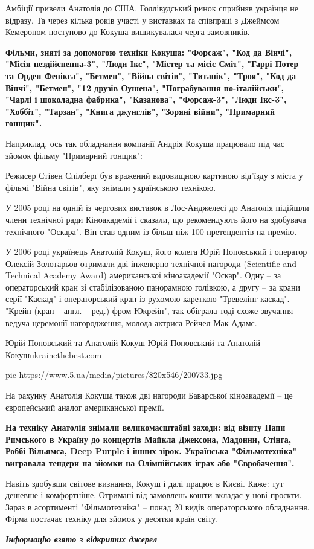 Амбіції привели Анатолія до США. Голлівудський ринок сприйняв українця не
відразу. Та через кілька років участі у виставках та співпраці з Джеймсом
Кемероном поступово до Кокуша вишикувалася черга замовників.

{\bfseries
Фільми, зняті за допомогою техніки Кокуша: "Форсаж", "Код да Вінчі",
"Місія нездійсненна-3", "Люди Ікс", "Містер та місіс Сміт", "Гаррі Потер
та Орден Фенікса", "Бетмен", "Війна світів", "Титанік", "Троя", "Код да
Вінчі", "Бетмен", "12 друзів Оушена", "Пограбування по-італійськи",
"Чарлі і шоколадна фабрика", "Казанова", "Форсаж-3", "Люди Ікс-3",
"Хоббіт", "Тарзан", "Книга джунглів", "Зоряні війни", "Примарний
гонщик".
}

Наприклад, ось так обладнання компанії Андрія Кокуша працювало під час
зйомок фільму "Примарний гонщик":

Режисер Стівен Спілберґ був вражений видовищною картиною від'їзду з міста
у фільмі "Війна світів", яку знімали українською технікою.

У 2005 році на одній із чергових виставок в Лос-Анджелесі до Анатолія
підійшли члени технічної ради Кіноакадемії і сказали, що рекомендують його
на здобувача технічного "Оскара". Він став одним із більш ніж 100
претендентів на премію.

У 2006 році українець Анатолій Кокуш, його колега Юрій Поповський і
оператор Олексій Золотарьов отримали дві інженерно-технічної нагороди
(Scientific and Technical Academy Award) американської кіноакадемії
"Оскар". Одну – за операторський кран зі стабілізованою панорамною
голівкою, а другу – за крани серії "Каскад" і операторський кран із
рухомою кареткою "Тревелінг каскад". "Крейн (кран – англ. – ред.) фром
Юкрейн", так обіграла тоді схоже звучання ведуча церемонії нагородження,
молода актриса Рейчел Мак-Адамс.

Юрій Поповський та Анатолій Кокуш  Юрій Поповський та Анатолій
Кокушukrainethebest.com

\ifcmt
pic https://www.5.ua/media/pictures/820x546/200733.jpg
\fi

На рахунку Анатолія Кокуша також дві нагороди Баварської кіноакадемії – це
європейський аналог американської премії.

{\bfseries
На техніку Анатолія знімали великомасштабні заходи: від візиту Папи
Римського в Україну до концертів Майкла Джексона, Мадонни, Стінга, Роббі
Вільямса, Deep Purple і інших зірок. Українська "Фільмотехніка"
вигравала тендери на зйомки на Олімпійських іграх або "Євробачення".
}

Навіть здобувши світове визнання, Кокуш і далі працює в Києві. Каже: тут
дешевше і комфортніше. Отримані від замовлень кошти вкладає у нові
проєкти. Зараз в асортименті "Фільмотехніка" – понад 20 видів
операторського обладнання. Фірма постачає техніку для зйомок у десятки
країн світу.

\textbf{\emph{Інформацію взято з відкритих джерел}}


